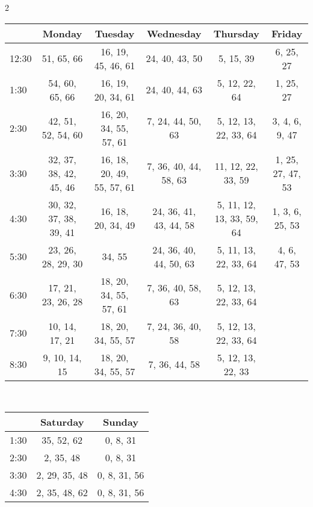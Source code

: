 \documentclass{article}
\begin{document}
\begin{multicols}{2}
\def\arraystretch{1.5}
\begin{table*}[ht]
\small
   \centering
   \begin{tabular}{ l | c | c | c | c | c }
      \textit& Monday & Tuesday & Wednesday & Thursday & Friday \\ \hline
      12:30 & 51, 65, 66 & 16, 19, 45, 46, 61 & 24, 40, 43, 50 & 5, 15, 39 & 6, 25, 27 \\
      1:30 & 54, 60, 65, 66 & 16, 19, 20, 34, 61 & 24, 40, 44, 63 & 5, 12, 22, 64 & 1, 25, 27 \\
      2:30 & 42, 51, 52, 54, 60 & 16, 20, 34, 55, 57, 61 & 7, 24, 44, 50, 63 & 5, 12, 13, 22, 33, 64 & 3, 4, 6, 9, 47 \\
      3:30 & 32, 37, 38, 42, 45, 46 & 16, 18, 20, 49, 55, 57, 61 & 7, 36, 40, 44, 58, 63 & 11, 12, 22, 33, 59 & 1, 25, 27, 47, 53 \\
      4:30 & 30, 32, 37, 38, 39, 41 & 16, 18, 20, 34, 49 & 24, 36, 41, 43, 44, 58 & 5, 11, 12, 13, 33, 59, 64 & 1, 3, 6, 25, 53 \\
      5:30 & 23, 26, 28, 29, 30 & 34, 55 & 24, 36, 40, 44, 50, 63 & 5, 11, 13, 22, 33, 64 & 4, 6, 47, 53 \\
      6:30 & 17, 21, 23, 26, 28 & 18, 20, 34, 55, 57, 61 & 7, 36, 40, 58, 63 & 5, 12, 13, 22, 33, 64 &  \\
      7:30 & 10, 14, 17, 21 & 18, 20, 34, 55, 57 & 7, 24, 36, 40, 58 & 5, 12, 13, 22, 33, 64 &  \\
      8:30 & 9, 10, 14, 15 & 18, 20, 34, 55, 57 & 7, 36, 44, 58 & 5, 12, 13, 22, 33 &  \\
   \end{tabular}
   \\[10pt]
   \centering
   \begin{tabular}{ l | c | c }   
      \textit & Saturday & Sunday \\ \hline
      1:30 & 35, 52, 62 & 0, 8, 31 \\
      2:30 & 2, 35, 48 & 0, 8, 31 \\
      3:30 & 2, 29, 35, 48 & 0, 8, 31, 56 \\
      4:30 & 2, 35, 48, 62 & 0, 8, 31, 56 \\
   \end{tabular}
   \\[10pt]
   \caption*{Time slot assignments for the sixty-seven TAs working during Autumn 2014. Each cell contains the TAs assigned to a given hour on a given day.}
\end{table*}
\end{multicols}
\end{document}
